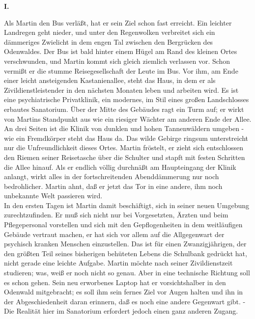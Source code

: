 \begin{center}
{\bf I.}
\end{center}
Als Martin den Bus verl\"a{\ss}t, hat er sein Ziel schon fast erreicht. Ein
leichter Landregen geht nieder, und unter den Regenwolken verbreitet sich
ein d\"ammeriges Zwielicht in dem engen Tal zwischen den Bergr\"ucken des
Odenwaldes. Der Bus ist bald hinter einem H\"ugel am Rand des kleinen Ortes
verschwunden, und Martin kommt sich gleich ziemlich verlassen vor. Schon
vermi{\ss}t er die stumme Reisegesellschaft der Leute im Bus. Vor ihm, am
Ende einer leicht ansteigenden Kastanienallee, steht das Haus, in dem er als
Zivildienstleistender in den n\"achsten Monaten leben und arbeiten wird. Es
ist eine psychiatrische Privatklinik, ein modernes, im Stil eines gro{\ss}en
Landschlosses erbautes Sanatorium. \"Uber der Mitte des Geb\"audes ragt ein
Turm auf; er wirkt von Martins Standpunkt aus wie ein riesiger W\"achter am
anderen Ende der Allee. An drei Seiten ist die Klinik von dunklen und hohen
Tannenw\"aldern umgeben - wie ein Fremdk\"orper steht das Haus da. Das wilde
Gebirge ringsum unterstreicht nur die Unfreundlichkeit dieses Ortes. Martin
fr\"ostelt, er zieht sich entschlossen den Riemen seiner Reisetasche \"uber
die Schulter und stapft mit festen Schritten die Allee hinauf. Als er endlich
v\"ollig durchn\"a{\ss}t am Haupteingang der Klinik anlangt, wirkt alles in
der fortschreitenden Abendd\"ammerung nur noch bedrohlicher. Martin ahnt,
da{\ss} er jetzt das Tor in eine andere, ihm noch unbekannte Welt passieren
wird. \\
In den ersten Tagen ist Martin damit besch\"aftigt, sich in seiner neuen
Umgebung zurechtzufinden. Er mu{\ss} sich nicht nur bei Vorgesetzten, \"Arzten
und beim Pflegepersonal vorstellen und sich mit den Gepflogenheiten in dem
weitl\"aufigen Geb\"aude vertraut machen, er hat sich vor allem auf die
Allgegenwart der psychisch kranken Menschen einzustellen. Das ist f\"ur
einen Zwanzigj\"ahrigen, der den gr\"o{\ss}ten Teil seines bisherigen
beh\"uteten Lebens die Schulbank gedr\"uckt hat, nicht gerade eine leichte
Aufgabe. Martin m\"ochte nach seiner Zivildienstzeit studieren; was, wei{\ss}
er noch nicht so genau. Aber in eine technische Richtung soll es schon gehen.
Sein neu erworbenes Laptop hat er vorsichtshalber in den Odenwald mitgebracht;
es soll ihm sein fernes Ziel vor Augen halten und ihn in der Abgeschiedenheit
daran erinnern, da{\ss} es noch eine andere Gegenwart gibt. - \\
Die Realit\"at hier im Sanatorium erfordert jedoch einen ganz anderen Zugang.

